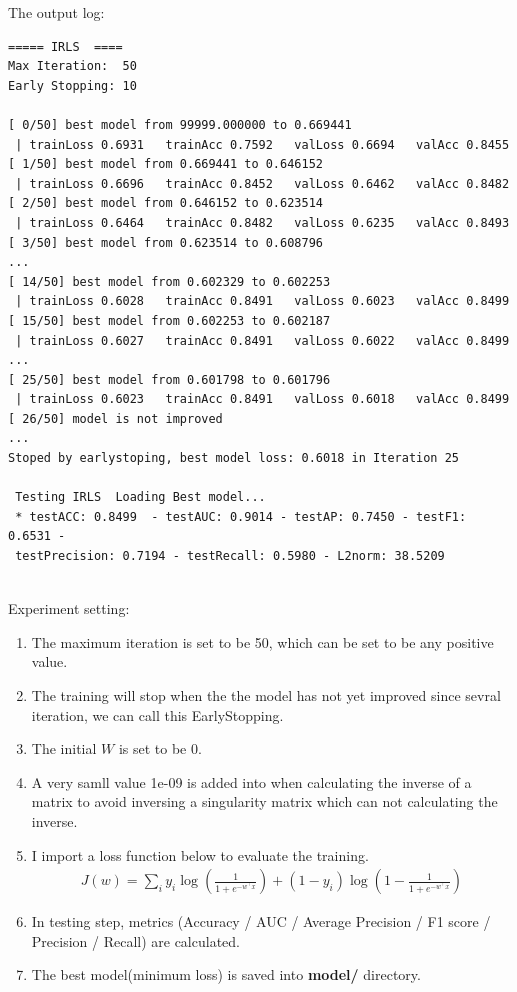 \documentclass[a4paper]{article}
\begin{document}
The output log:
\begin{verbatim}
===== IRLS  ====
Max Iteration:  50
Early Stopping: 10

[ 0/50] best model from 99999.000000 to 0.669441 
 | trainLoss 0.6931   trainAcc 0.7592   valLoss 0.6694   valAcc 0.8455
[ 1/50] best model from 0.669441 to 0.646152 
 | trainLoss 0.6696   trainAcc 0.8452   valLoss 0.6462   valAcc 0.8482
[ 2/50] best model from 0.646152 to 0.623514 
 | trainLoss 0.6464   trainAcc 0.8482   valLoss 0.6235   valAcc 0.8493
[ 3/50] best model from 0.623514 to 0.608796 
...
[ 14/50] best model from 0.602329 to 0.602253 
 | trainLoss 0.6028   trainAcc 0.8491   valLoss 0.6023   valAcc 0.8499
[ 15/50] best model from 0.602253 to 0.602187 
 | trainLoss 0.6027   trainAcc 0.8491   valLoss 0.6022   valAcc 0.8499
...
[ 25/50] best model from 0.601798 to 0.601796 
 | trainLoss 0.6023   trainAcc 0.8491   valLoss 0.6018   valAcc 0.8499
[ 26/50] model is not improved
...
Stoped by earlystoping, best model loss: 0.6018 in Iteration 25 

 Testing IRLS  Loading Best model...
 * testACC: 0.8499  - testAUC: 0.9014 - testAP: 0.7450 - testF1: 0.6531 - 
 testPrecision: 0.7194 - testRecall: 0.5980 - L2norm: 38.5209
\end{verbatim}

$\qquad$\\

Experiment setting:\\

\begin{enumerate}[1.]
\item The maximum iteration is set to be 50, which can be set to be any positive value.
\item The training will stop when the the model has not yet improved since sevral iteration, we can call this EarlyStopping.
\item The initial $W$ is set to be 0.
\item A very samll value 1e-09 is added into when calculating the inverse of a matrix to avoid inversing a singularity matrix which can not calculating the inverse.
\item I import a loss function below to evaluate the training.
      \begin{equation}
          \begin{aligned}
          J(w) = \sum_{i} {y_i \log{(\frac{1}{1+e^{-w^{\top}x}})} +(1-y_i) \log{(1-\frac{1}{1+e^{-w^{\top}x}})}} 
          \end{aligned}
      \end{equation}
\item In testing step, metrics (Accuracy / AUC / Average Precision / F1 score / Precision / Recall) are calculated.
\item The best model(minimum loss) is saved into \textbf{model/} directory.
\end{enumerate}
\end{document}
